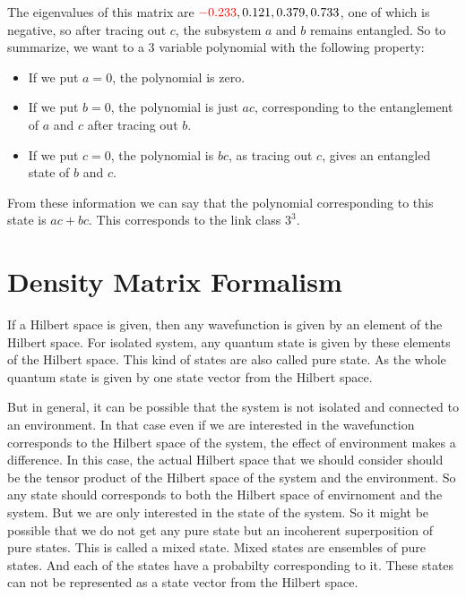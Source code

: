 \documentclass{amsart}
\theoremstyle{plain}
\theoremstyle{definition}
\theoremstyle{plain}
\begin{document}
	The eigenvalues of this matrix are $\mathcolor{red}{-0.233}, 0.121, 0.379, 0.733$, one of which is negative, so after tracing out $c$, the subsystem $a$ and $b$ remains entangled.
 So to summarize, we want to a 3 variable polynomial with the following property:
	\begin{itemize}
		\item If we put $a = 0$, the polynomial is zero.
		\item If we put $b = 0$, the polynomial is just $ac$, corresponding to the entanglement of $a$ and $c$ after tracing out $b$.
		\item If we put $c = 0$, the polynomial is $bc$, as tracing out $c$, gives an entangled state of $b$ and $c$.
	\end{itemize}
	From these information we can say that the polynomial corresponding to this state is $ac + bc$. This corresponds to the link class $3^3$.
    
\section{Density Matrix Formalism}
If a Hilbert space is given, then any wavefunction is given by an element of the Hilbert space. For isolated system, any quantum state is given by these elements of the Hilbert space. This kind of states are also called pure state. As the whole quantum state is given by one state vector from the Hilbert space.

But in general, it can be possible that the system is not isolated and connected to an environment. In that case even if we are interested in the wavefunction corresponds to the Hilbert space of the system, the effect of environment makes a difference. In this case, the actual Hilbert space that we should consider should be the tensor product of the Hilbert space of the system and the environment. So any state should corresponds to both the Hilbert space of envirnoment and the system. But we are only interested in the state of the system. So it might be possible that we do not get any pure state but an incoherent superposition of pure states. This is called a mixed state. Mixed states are ensembles of pure states. And each of the states have a probabilty corresponding to it. These states can not be represented as a state vector from the Hilbert space.
\end{document}
